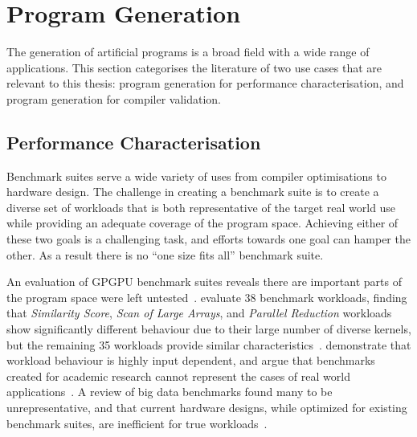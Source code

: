 \section{Program Generation}
\label{sec:related-work-generation}

The generation of artificial programs is a broad field with a wide range of applications. This section categorises the literature of two use cases that are relevant to this thesis: program generation for performance characterisation, and program generation for compiler validation.

\subsection{Performance Characterisation}
\label{subsec:training-with-synthetic-benchmarks}

Benchmark suites serve a wide variety of uses from compiler optimisations to hardware design. The challenge in creating a benchmark suite is to create a diverse set of workloads that is both representative of the target real world use while providing an adequate coverage of the program space. Achieving either of these two goals is a challenging task, and efforts towards one goal can hamper the other. As a result there is no ``one size fits all'' benchmark suite.

An evaluation of GPGPU benchmark suites reveals there are important parts of the program space were left untested~\cite{Ryoo2015}.
\citeauthor{Goswami2010} evaluate 38 benchmark workloads, finding that \emph{Similarity Score}, \emph{Scan of Large Arrays}, and \emph{Parallel Reduction} workloads show significantly different behaviour due to their large number of diverse kernels, but the remaining 35 workloads provide similar characteristics~\cite{Goswami2010}.
\citeauthor{Xiong2013} demonstrate that workload behaviour is highly input dependent, and argue that benchmarks created for academic research cannot represent the cases of real world applications~\cite{Xiong2013}.
A review of big data benchmarks found many to be unrepresentative, and that current hardware designs, while optimized for existing benchmark suites, are inefficient for true workloads~\cite{Ferdman2012}.

